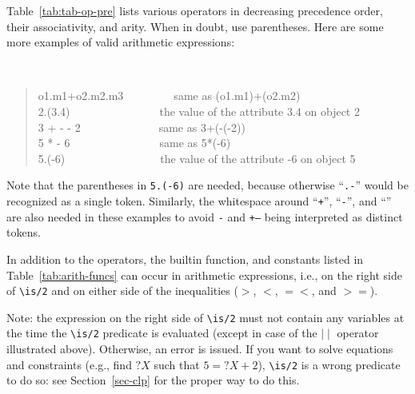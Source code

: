 \documentclass[11pt]{article}
\newcommand{\bs}{\textbackslash}
\begin{document}
Table~\ref{tab:tab-op-pre} lists various operators in decreasing precedence
order, their associativity, and arity.  When in doubt, use parentheses.
Here are some more examples of valid arithmetic expressions:
{\tt
\begin{quote}
o1.m1+o2.m2.m3~~~~~~~~~{\rm same as} (o1.m1)+(o2.m2)\\
2.(3.4)~~~~~~~~~~~~~~~~{\rm the value of the attribute} 3.4 {\rm on object} 2\\
3 + - - 2~~~~~~~~~~~~~~{\rm same as} 3+(-(-2))\\
5 * - 6~~~~~~~~~~~~~~~~{\rm same as} 5*(-6)\\
5.(-6)~~~~~~~~~~~~~~~~~{\rm the value of the attribute} -6 {\rm on object} 5
\end{quote}
}
Note that the parentheses in {\tt 5.(-6)} are needed,
because otherwise ``{\tt .-}'' would be recognized as a single token.
Similarly, the whitespace around ``{\tt +}'', ``{\tt -}'', and ``{\tt *}''
are also needed in these examples to avoid {\tt *-} and {\tt +--} being
interpreted as distinct tokens.



In addition to the operators, the builtin function, and constants
listed in Table~\ref{tab:arith-funcs}
can occur in arithmetic expressions, i.e., on the right side of
\texttt{\bs{}is/2}
 and on either side of the inequalities ($>$, $<$, $=<$, and $>=$).

\noindent
Note: the expression on the right side of \texttt{\bs{}is/2} must not
contain any variables at the time the \texttt{\bs{}is/2} predicate is
evaluated (except in case of the $\mid\mid$ operator illustrated above).
Otherwise, an error is issued. If you want to solve equations and
constraints (e.g., find $?X$ such that $5 = ?X+2$), \texttt{\bs{}is/2} is a wrong predicate to do so: see
Section~\ref{sec-clp} for the proper way to do this.
\end{document}
